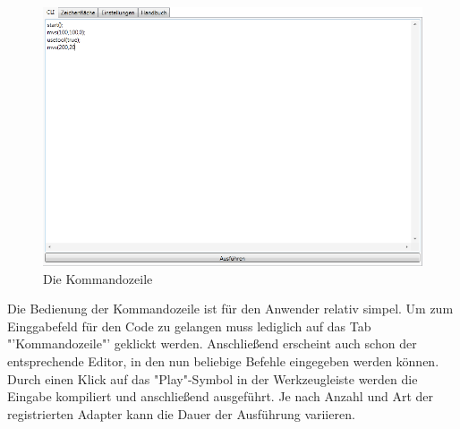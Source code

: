 \begin{figure}[H]
  \centering
  \begin{minipage}[t]{12 cm}
  	\centering
  	\includegraphics[width=12cm]{images/CLI} 
    \caption{Die Kommandozeile}
  \end{minipage}
\end{figure}

Die Bedienung der Kommandozeile ist für den Anwender relativ simpel. Um zum Einggabefeld für den Code zu gelangen muss lediglich auf das Tab "'Kommandozeile"' geklickt werden. Anschließend erscheint auch schon der entsprechende Editor, in den nun beliebige Befehle eingegeben werden können. Durch einen Klick auf das "Play"-Symbol in der Werkzeugleiste werden die Eingabe kompiliert und anschließend ausgeführt. Je nach Anzahl und Art der registrierten Adapter kann die Dauer der Ausführung variieren.

